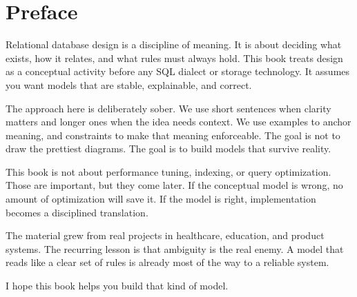 \chapter*{Preface}

Relational database design is a discipline of meaning.
It is about deciding what exists, how it relates, and what rules must always hold.
This book treats design as a conceptual activity before any SQL dialect or storage technology.
It assumes you want models that are stable, explainable, and correct.

The approach here is deliberately sober.
We use short sentences when clarity matters and longer ones when the idea needs context.
We use examples to anchor meaning, and constraints to make that meaning enforceable.
The goal is not to draw the prettiest diagrams.
The goal is to build models that survive reality.

This book is not about performance tuning, indexing, or query optimization.
Those are important, but they come later.
If the conceptual model is wrong, no amount of optimization will save it.
If the model is right, implementation becomes a disciplined translation.

The material grew from real projects in healthcare, education, and product systems.
The recurring lesson is that ambiguity is the real enemy.
A model that reads like a clear set of rules is already most of the way to a reliable system.

I hope this book helps you build that kind of model.
